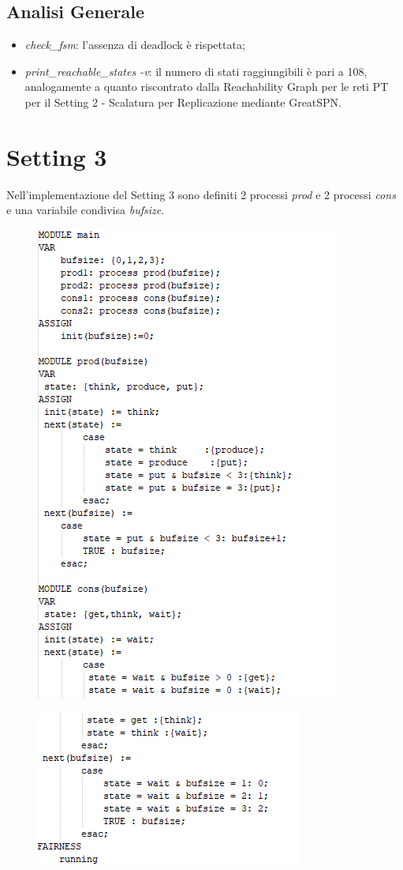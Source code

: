 \documentclass{article}
\begin{document}
\subsection{Analisi Generale}
    \begin{itemize}
        \item \textit{check\_fsm}: l'assenza di deadlock è rispettata;
        \item \textit{print\_reachable\_states -v}: il numero di stati raggiungibili è pari a 108, analogamente a quanto riscontrato dalla Reachability Graph per le reti PT per il Setting 2 - Scalatura per Replicazione mediante GreatSPN.
    \end{itemize}
\clearpage
\section{Setting 3}
Nell'implementazione del Setting 3 sono definiti 2 processi \textit{prod} e 2 processi \textit{cons} e una variabile condivisa \textit{bufsize}.
\begin{figure}[h] 
\centering
\includegraphics[scale=0.8]{setting31.png}
\end{figure}
\begin{figure}[h] 
\centering
\includegraphics[scale=0.9]{setting32.png}
\end{figure}
\end{document}
